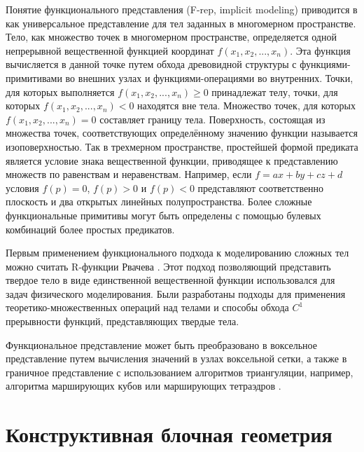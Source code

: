 Понятие функционального представления (F-rep, implicit modeling) приводится в \cite{pasko1995function} как универсальное представление для тел заданных в многомерном пространстве. Тело, как множество точек в многомерном пространстве, определяется одной непрерывной вещественной функцией координат $f(x_{1},x_{2},...,x_{n})$. Эта функция вычисляется в данной точке путем обхода древовидной структуры с функциями-примитивами во внешних узлах и функциями-операциями во внутренних. Точки, для которых выполняется $f(x_{1},x_{2},...,x_{n})\geq 0$ принадлежат телу, точки, для которых $ f(x_{1},x_{2},...,x_{n})<0$ находятся вне тела. Множество точек, для которых $f(x_{1},x_{2},...,x_{n})=0$ составляет границу тела. Поверхность, состоящая из множества точек, соответствующих определённому значению функции называется изоповерхностью. Так в трехмерном пространстве, простейшей формой предиката является условие знака вещественной функции, приводящее к представлению множеств по равенствам и неравенствам. Например, если $ f = ax + by + cz + d$  условия $f (p) = 0$, $f (p)> 0$ и $f (p) <0$ представляют соответственно плоскость и два открытых линейных полупространства. Более сложные функциональные примитивы могут быть определены с помощью булевых комбинаций более простых предикатов.

Первым применением функционального подхода к моделированию сложных тел можно считать R-функции Рвачева \cite{Rvachev82}. Этот подход позволяющий представить твердое тело в виде единственной вещественной функции использовался для задач физического моделирования. Были разработаны подходы для применения теоретико-множественных операций над телами и способы обхода $C^1$ прерывности функций, представляющих твердые тела.

Функциональное представление может быть преобразовано в воксельное представление путем вычисления значений в узлах воксельной сетки, а также в граничное представление с использованием алгоритмов триангуляции, например, алгоритма марширующих кубов \cite{lorensen1987marching} или марширующих тетраэдров \cite{muller1997visualization}.

\section{Конструктивная блочная геометрия} \label{sect_csg}

